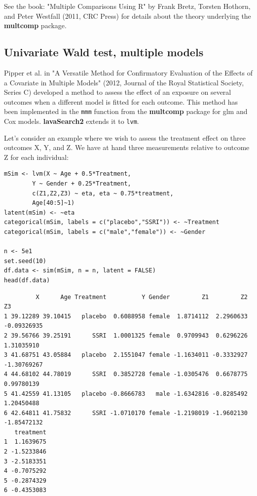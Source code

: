 \documentclass[12pt]{article}
\begin{document}
See the book: "Multiple Comparisons Using R" by Frank Bretz, Torsten
Hothorn, and Peter Westfall (2011, CRC Press) for details about the
theory underlying the \textbf{multcomp} package.

\subsection{Univariate Wald test, multiple models}
\label{sec:org29ce6f5}

Pipper et al. in "A Versatile Method for Confirmatory Evaluation of
the Effects of a Covariate in Multiple Models" (2012, Journal of the
Royal Statistical Society, Series C) developed a method to assess the
effect of an exposure on several outcomes when a different model is
fitted for each outcome. This method has been implemented in the \texttt{mmm}
function from the \textbf{multcomp} package for glm and Cox
models. \textbf{lavaSearch2} extends it to \texttt{lvm}. 

Let's consider an example where we wish to assess the treatment effect
on three outcomes X, Y, and Z. We have at hand three measurements
relative to outcome Z for each individual:
\lstset{language=r,label= ,caption= ,captionpos=b,numbers=none}
\begin{lstlisting}
mSim <- lvm(X ~ Age + 0.5*Treatment,
	    Y ~ Gender + 0.25*Treatment,
	    c(Z1,Z2,Z3) ~ eta, eta ~ 0.75*treatment,
	    Age[40:5]~1)
latent(mSim) <- ~eta
categorical(mSim, labels = c("placebo","SSRI")) <- ~Treatment
categorical(mSim, labels = c("male","female")) <- ~Gender

n <- 5e1
set.seed(10)
df.data <- sim(mSim, n = n, latent = FALSE)
head(df.data)
\end{lstlisting}

\begin{verbatim}
         X      Age Treatment          Y Gender         Z1         Z2          Z3
1 39.12289 39.10415   placebo  0.6088958 female  1.8714112  2.2960633 -0.09326935
2 39.56766 39.25191      SSRI  1.0001325 female  0.9709943  0.6296226  1.31035910
3 41.68751 43.05884   placebo  2.1551047 female -1.1634011 -0.3332927 -1.30769267
4 44.68102 44.78019      SSRI  0.3852728 female -1.0305476  0.6678775  0.99780139
5 41.42559 41.13105   placebo -0.8666783   male -1.6342816 -0.8285492  1.20450488
6 42.64811 41.75832      SSRI -1.0710170 female -1.2198019 -1.9602130 -1.85472132
   treatment
1  1.1639675
2 -1.5233846
3 -2.5183351
4 -0.7075292
5 -0.2874329
6 -0.4353083
\end{verbatim}
\end{document}
